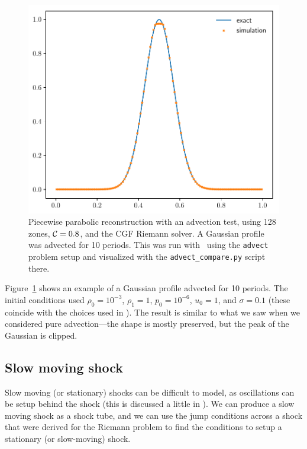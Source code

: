 \begin{figure}[t]
\centering
\includegraphics[width=0.7\linewidth]{advect_hydro1d}
\caption[Simple advection test]{\label{fig:Euler:advect:1d} Piecewise
  parabolic reconstruction with an advection test, using 128 zones,
  ${\mathcal{C}} = 0.8$, and the CGF Riemann solver.  A Gaussian profile was
  advected for 10 periods.  This was run with \hydrooned\ using the
  {\tt advect} problem setup and
  visualized with the {\tt advect\_compare.py} script there.}
\end{figure}

Figure~\ref{fig:Euler:advect:1d} shows an example of a Gaussian profile
advected for 10 periods.  The initial conditions used $\rho_0 = 10^{-3}$,
$\rho_1 = 1$, $p_0 = 10^{-6}$, $u_0 = 1$, and $\sigma = 0.1$ (these 
coincide with the choices used in \cite{flash}).  The result is similar
to what we saw when we considered pure advection---the shape is mostly
preserved, but the peak of the Gaussian is clipped.

\subsection{Slow moving shock}

Slow moving (or stationary) shocks can be difficult to model, as
oscillations can be setup behind the shock (this is discussed a little
in \cite{colellawoodward:1984,leveque:2002}).  We can produce a slow
moving shock as a shock tube, and we can use the jump conditions 
across a shock that were derived for the Riemann problem to find the
conditions to setup a stationary (or slow-moving) shock.  

